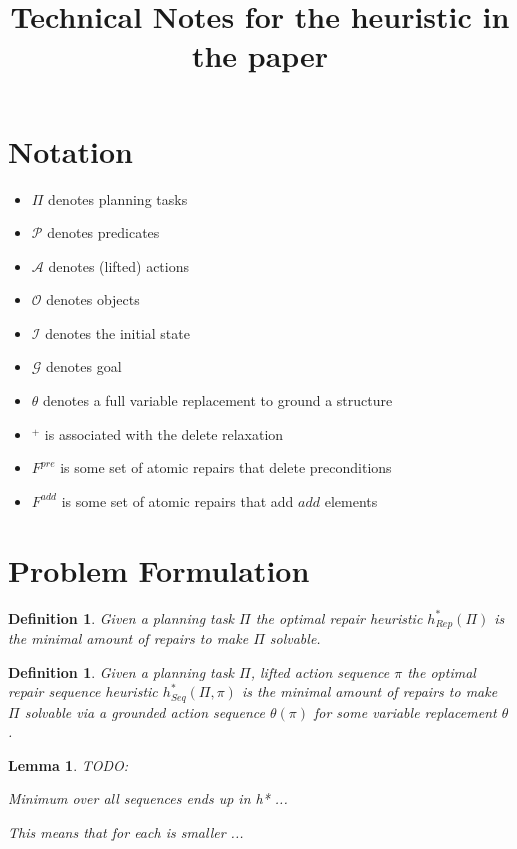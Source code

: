 \documentclass[twocolumn]{article}
\title{Technical Notes for the heuristic in the paper}
\newcommand{\task}{\ensuremath{\Pi}\xspace}
\newcommand{\preds}{\ensuremath{\mathcal{P}}\xspace}
\newcommand{\acts}{\ensuremath{\mathcal{A}}\xspace}
\newcommand{\objects}{\ensuremath{\mathcal{O}}\xspace}
\newcommand{\init}{\ensuremath{\mathcal{I}}\xspace}
\newcommand{\goal}{\ensuremath{\mathcal{G}}\xspace}
\newcommand{\varRepl}{\ensuremath{\theta}\xspace}
\newcommand{\prename}{\ensuremath{pre}\xspace}
\newcommand{\addname}{\ensuremath{add}\xspace}
\newcommand{\fixPre}{\ensuremath{F^{\prename}}\xspace}
\newcommand{\fixAdd}{\ensuremath{F^{\addname}}\xspace}
\newcommand{\someActSeq}{\ensuremath{\pi}\xspace}
\newcommand{\optimalHeuristic}{\ensuremath{h^{*}_{Rep}}\xspace}
\newcommand{\optimalHeuristicSeq}{\ensuremath{h^{*}_{Seq}}\xspace}
\newtheorem{lemma}[theorem]{Lemma}
\newtheorem{definition}[theorem]{Definition}
\begin{document}
	
	\maketitle
	
	\section{Notation}
	
	\begin{itemize}[noitemsep]
		\item \task denotes planning tasks
		\item \preds denotes predicates
		\item \acts denotes (lifted) actions
		\item \objects denotes objects
		\item \init denotes the initial state
		\item \goal denotes goal
		\item \varRepl denotes a full variable replacement to ground a structure
		\item $^+$ is associated with the delete relaxation
		\item \fixPre is some set of atomic repairs that delete preconditions
		\item \fixAdd is some set of atomic repairs that add \addname elements
	\end{itemize}
	
	
	\section{Problem Formulation}
	
	\begin{definition}
		Given a planning task \task the optimal repair heuristic $\optimalHeuristic(\task)$ is the minimal amount of repairs to make \task solvable.
	\end{definition}
	
	\begin{definition}
		Given a planning task \task, lifted action sequence \someActSeq the optimal repair sequence heuristic $\optimalHeuristicSeq(\task, \someActSeq)$ is the minimal amount of repairs to make \task solvable via a grounded action sequence $\varRepl(\someActSeq)$ for some variable replacement \varRepl.
	\end{definition}
	
	\begin{lemma}
		TODO:
		
		Minimum over all sequences ends up in h* ...
		
		This means that for each is smaller ...
	\end{lemma}
	
\end{document}
